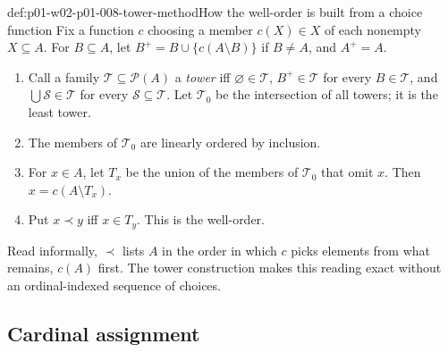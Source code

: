 \begin{hbmethod}{def:p01-w02-p01-008-tower-method}{How the well-order is built from a choice function}
Fix a function \(c\) choosing a member \(c(X)\in X\) of each nonempty
\(X\subseteq A\). For \(B\subseteq A\), let \(B^{+}=B\cup\{c(A\setminus B)\}\)
if \(B\neq A\), and \(A^{+}=A\).
\begin{enumerate}
  \item Call a family \(\mathcal T\subseteq\mathcal P(A)\) a \emph{tower} iff
        \(\varnothing\in\mathcal T\), \(B^{+}\in\mathcal T\) for every
        \(B\in\mathcal T\), and \(\bigcup\mathcal S\in\mathcal T\) for every
        \(\mathcal S\subseteq\mathcal T\). Let \(\mathcal T_0\) be the
        intersection of all towers; it is the least tower.
  \item The members of \(\mathcal T_0\) are linearly ordered by inclusion.
  \item For \(x\in A\), let \(T_x\) be the union of the members of
        \(\mathcal T_0\) that omit \(x\). Then \(x=c(A\setminus T_x)\).
  \item Put \(x\prec y\) iff \(x\in T_y\). This is the well-order.
\end{enumerate}
Read informally, \(\prec\) lists \(A\) in the order in which \(c\) picks
elements from what remains, \(c(A)\) first. The tower construction makes this
reading exact without an ordinal-indexed sequence of choices.
\end{hbmethod}

\subsection{Cardinal assignment}
\label{sec:p01-w02-p01-008-cardinals}

